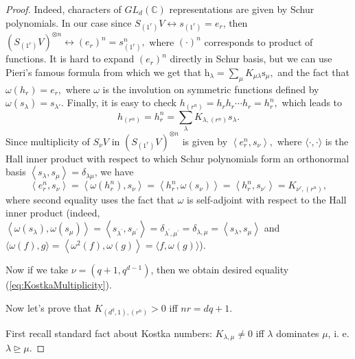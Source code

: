 \documentclass[10pt,twocolumn,superscriptaddress,aps,amsmath,amssymb,citeautoscript,floatfix,prx]{revtex4-2}
\theoremstyle{plain}
\theoremstyle{plain}
\theoremstyle{plain}
\theoremstyle{plain}
\theoremstyle{plain}
\theoremstyle{plain}
\theoremstyle{plain}
\theoremstyle{definition}
\theoremstyle{plain}
\begin{document}
\begin{appendix}
\begin{proof}
    Indeed, characters of $GL_d(\mathbb{C})$ representations are given by Schur polynomials. 
    In our case since $S_{\left(1^r\right)}V \leftrightarrow s_{\left(1^r\right)}=e_r$, then
    $
        \left(S_{\left(1^r\right)}V\right)^{\otimes n} \leftrightarrow\left(e_r\right)^n=s_{\left(1^r\right)}^n,
    $
    where $(\cdot)^n$ corresponds to product of functions. It is hard to expand $\left(e_r\right)^n$
    directly in Schur basis, but we can use Pieri's famous formula from which we get that
    $
        \mathrm{h}_\lambda=\sum_\mu K_{\mu \lambda} \mathrm{s}_\mu,
    $
    and the fact that 
    $
        \omega\left(h_r\right)=e_r,
    $
    where $\omega$ is the involution on symmetric functions defined by $\omega\left(s_\lambda\right)=s_{\lambda'}$. Finally, it is easy to check
    $
        h_{\left(r^n\right)}=h_r h_r \cdots h_r=h_r^n,
    $
    which leads to
    \[
        h_{\left(r^n\right)}=h_r^n=\sum_\lambda K_{\lambda,\left(r^n\right)} s_\lambda.
    \]
    Since multiplicity of $S_\nu V$ in $\left(S_{\left(1^r\right)}V\right)^{\otimes n}$ is given by
    $
        \left\langle e_r^n, s_\nu\right\rangle,
    $
    where $\langle\cdot, \cdot\rangle$ is the Hall inner product with respect to which Schur polynomials form an orthonormal basis $\left\langle s_\lambda, s_\mu\right\rangle=\delta_{\lambda \mu}$, we have
    \[
        \left\langle e_r^n, s_\nu\right\rangle=\left\langle\omega\left(h_r^n\right), s_\nu\right\rangle=\left\langle h_r^n, \omega\left(s_\nu\right)\right\rangle=\left\langle h_r^n, s_{\nu^{\prime}}\right\rangle=K_{\nu', (r^n)},
    \]
    where second equality uses the fact that $\omega$ is self-adjoint with respect to the Hall inner product (indeed, 
    $\left\langle\omega\left(s_\lambda\right), \omega\left(s_\mu\right)\right\rangle=\left\langle s_{\lambda^{\prime}}, s_{\mu^{\prime}}\right\rangle=\delta_{\lambda^{\prime}, \mu^{\prime}}=\delta_{\lambda, \mu}=\left\langle s_\lambda, s_\mu\right\rangle$
    and $\langle\omega(f), g\rangle=\left\langle\omega^2(f), \omega(g)\right\rangle=\langle f, \omega(g)\rangle$).
    
    Now if we take $\nu=\left(q+1, q^{d-1}\right)$, then we obtain desired equality (\ref{eq:KostkaMultiplicity}).
    
    Now let's prove that $K_{\left(d^q, 1\right),\left(r^n\right)} > 0$ iff $n r=d q+1$.
    
    First recall standard fact about Kostka numbers: $K_{\lambda, \mu} \neq 0$ iff $\lambda$ dominates $\mu$, i. e. $\lambda \trianglerighteq \mu$.  
    

\end{proof}
\end{appendix}
\end{document}

